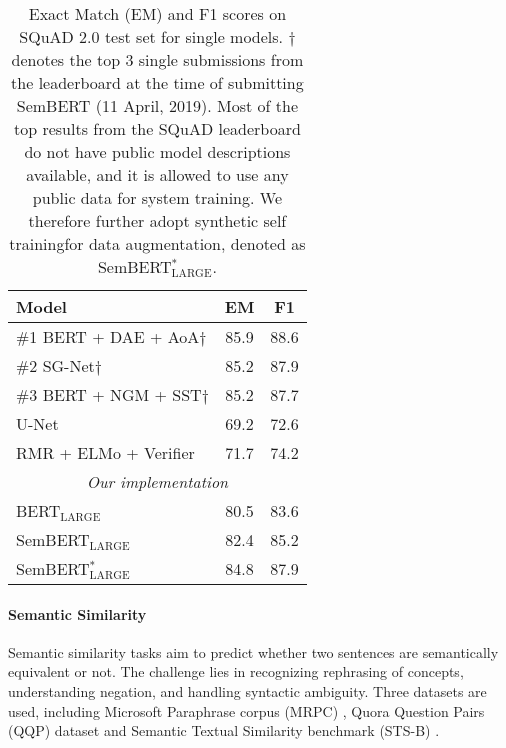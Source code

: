 \documentclass[letterpaper]{article} \usepackage{aaai20}  \usepackage{times}  \usepackage{helvet} \usepackage{courier}  \usepackage[hyphens]{url}  \usepackage{graphicx} \urlstyle{rm} \def\UrlFont{\rm}  \usepackage{graphicx}  \frenchspacing  \usepackage{amssymb}
\begin{document}
\begin{table} 
{
		\resizebox{\linewidth}{!}
	{
			\begin{tabular}{l c c}
				\hline
				
				\hline
				\textbf{Model} & \textbf{EM} & \textbf{F1}\\
				\hline
				\#1 BERT + DAE + AoA$\dagger$  & 85.9 & 88.6 \\
				\#2 SG-Net$\dagger$ & 85.2 & 87.9\\
				\#3 BERT + NGM + SST$\dagger$ & 85.2 & 87.7\\
				\hline
				U-Net \cite{sun2018u} & 69.2 & 72.6\\
				RMR + ELMo + Verifier \cite{hu2018read+}& 71.7 & 74.2 \\
				\hline
				\multicolumn{3}{c}{\emph{Our implementation}} \\
				BERT$_\text{LARGE}$  & 80.5 & 83.6 \\
				SemBERT$_\text{LARGE}$ & 82.4	& 85.2\\
				SemBERT$^*_\text{LARGE}$ & 84.8	& 87.9\\
				\hline
				
				\hline
			\end{tabular}
		}
		{
			\caption{\label{tab:squad2.0} Exact Match (EM) and F1 scores on SQuAD 2.0  test set for single models. $\dagger$ denotes the top 3 single submissions from the leaderboard at the time of submitting SemBERT (11 April, 2019). Most of the top results from the SQuAD leaderboard do not have public model descriptions available, and it is allowed to use any public data for system training. We therefore further adopt synthetic self training\footnotemark[7] for data augmentation, denoted as SemBERT$^*_\text{LARGE}$.}
		} 
}
\end{table}


\paragraph{Semantic Similarity}
Semantic similarity tasks aim to predict whether two sentences are semantically equivalent or not. The challenge lies in recognizing rephrasing of
concepts, understanding negation, and handling syntactic ambiguity. Three datasets are used, including Microsoft Paraphrase corpus (MRPC) \cite{dolan2005automatically}, Quora Question Pairs (QQP) dataset \cite{chen2018quora} and Semantic Textual Similarity benchmark (STS-B) \cite{cer2017semeval}.
\end{document}
